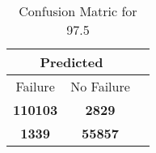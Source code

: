 \begin{table}[] 
\label{Table: Prediction Accuracy-DMD97.5OnlySunEKF-combinationReflection-Reflection} 
\caption{Confusion Matric for 97.5} 
\centering 
\begin{tabular} 
 {@{}ccc@{}} 
\toprule 
\multicolumn{2}{c}{\textbf{Predicted}}
 \\ \midrule 
\multicolumn{1}{|c|}{Failure} & 
\multicolumn{1}{c|}{No Failure}
 \\ \midrule 
\multicolumn{1}{|c|}{\color{green}\textbf{110103}} & 
\multicolumn{1}{c|}{\color{red}\textbf{2829}}
 \\ \midrule 
\multicolumn{1}{|c|}{\color{red}\textbf{1339}} & 
\multicolumn{1}{c|}{\color{green}\textbf{55857}}
 \\ \bottomrule 
\end{tabular} 
\end{table} 
